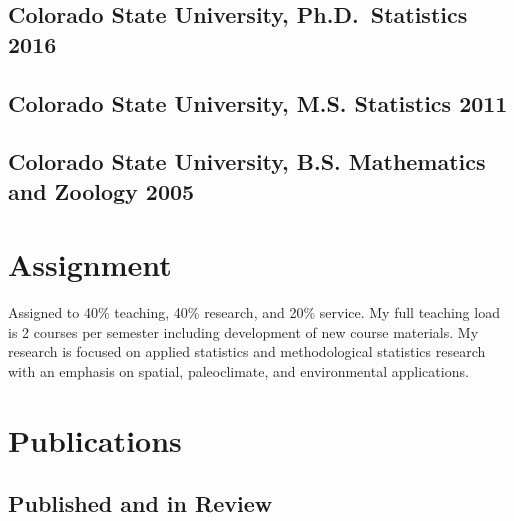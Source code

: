 \documentclass[11pt,]{article}
\begin{document}
\hypertarget{colorado-state-university-ph.d.-statistics-2016}{%
\subsection{\texorpdfstring{Colorado State University, Ph.D.~Statistics
\hfill 2016}{Colorado State University, Ph.D.~Statistics 2016}}\label{colorado-state-university-ph.d.-statistics-2016}}

\hypertarget{colorado-state-university-m.s.-statistics-2011}{%
\subsection{\texorpdfstring{Colorado State University, M.S. Statistics
\hfill 2011}{Colorado State University, M.S. Statistics 2011}}\label{colorado-state-university-m.s.-statistics-2011}}

\hypertarget{colorado-state-university-b.s.-mathematics-and-zoology-2005}{%
\subsection{\texorpdfstring{Colorado State University, B.S. Mathematics
and Zoology
\hfill 2005}{Colorado State University, B.S. Mathematics and Zoology 2005}}\label{colorado-state-university-b.s.-mathematics-and-zoology-2005}}

\hypertarget{assignment}{%
\section{Assignment}\label{assignment}}

Assigned to 40\% teaching, 40\% research, and 20\% service. My full
teaching load is 2 courses per semester including development of new
course materials. My research is focused on applied statistics and
methodological statistics research with an emphasis on spatial,
paleoclimate, and environmental applications.

\hypertarget{publications}{%
\section{Publications}\label{publications}}

\hypertarget{published-and-in-review}{%
\subsection{Published and in Review}\label{published-and-in-review}}
\end{document}
